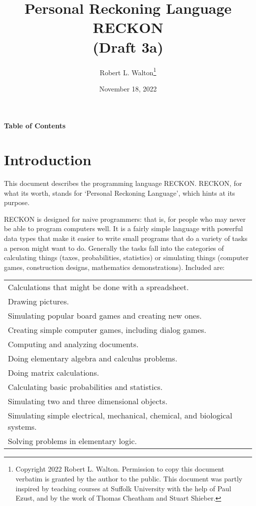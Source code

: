 \documentclass[12pt]{article}
\makeatletter
\renewcommand\tableofcontents{%
    \begin{list}{}%
	     {\setlength{\itemsep}{0in}%
	      \setlength{\topsep}{0in}%
	      \setlength{\parsep}{1ex}%
	      \setlength{\labelwidth}{0in}%
	      \setlength{\baselineskip}{1.5ex}%
	      \setlength{\leftmargin}{0.8in}%
	      \setlength{\rightmargin}{0.8in}}%
    \item\@starttoc{toc}%
    \end{list}}
\makeatother
\begin{document}
        
\title{Personal Reckoning Language\\[2ex]
       RECKON\\[2ex]
       (Draft 3a)}

\author{Robert L. Walton\thanks{Copyright 2022 Robert L. Walton.
Permission to copy this document verbatim is granted by the author
to the public.  This document was partly inspired
by teaching courses at Suffolk University with the help of
Paul Ezust, and by the work of Thomas
Cheatham and Stuart Shieber.}}

\date{November 18, 2022}

\maketitle

\newpage
\begin{center}
\large \bf Table of Contents
\end{center}

\bigskip

\tableofcontents 

\newpage

\section{Introduction}

This document describes the programming language RECKON.  RECKON,
for what its worth, stands for `Personal Reckoning Language',
which hints at its purpose.

RECKON is designed for naive programmers: that is, for people who may never
be able to program computers well.  It is a fairly simple language with
powerful data types that make it easier to write small programs
that do a variety of tasks a person might want to do.  Generally
the tasks fall into the categories of calculating things (taxes,
probabilities, statistics) or simulating things
(computer games, construction designs, mathematics demonstrations).
Included are:

\begin{center}
\begin{tabular}{l}
Calculations that might be done with a spreadsheet. \\
Drawing pictures. \\
Simulating popular board games and creating new ones. \\
Creating simple computer games, including dialog games. \\
Computing and analyzing documents. \\
Doing elementary algebra and calculus problems. \\
Doing matrix calculations. \\ 
Calculating basic probabilities and statistics. \\
Simulating two and three dimensional objects. \\
Simulating simple electrical, mechanical, chemical, and biological systems.\\
Solving problems in elementary logic. \\
\end{tabular}
\end{center}
\end{document}
